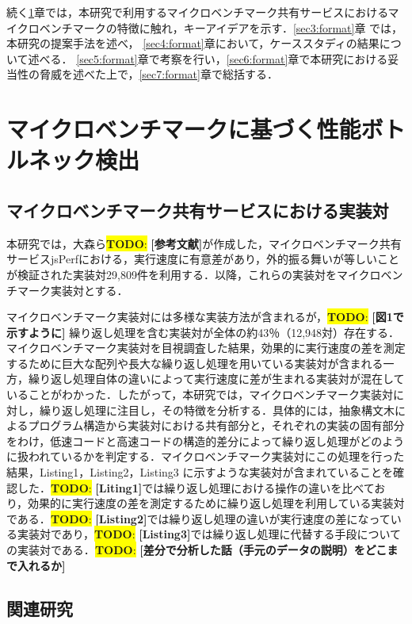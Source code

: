\documentclass[submit,techrep,noauthor]{ipsj}
\newcommand{\todo}[1]{\colorbox{yellow}{{\bf TODO}:}{\color{red} {\textbf{[#1]}}}}
\begin{document}
続く\ref{sec2:format}章では，本研究で利用するマイクロベンチマーク共有サービスにおけるマイクロベンチマークの特徴に触れ，キーアイデアを示す．\ref{sec3:format}章 では，本研究の提案手法を述べ， \ref{sec4:format}章において，ケーススタディの結果について述べる． \ref{sec5:format}章で考察を行い，\ref{sec6:format}章で本研究における妥当性の脅威を述べた上で，\ref{sec7:format}章で総括する． 


\section{マイクロベンチマークに基づく性能ボトルネック検出}
\label{sec2:format}

\subsection{マイクロベンチマーク共有サービスにおける実装対}

本研究では，大森ら\todo{参考文献}が作成した，マイクロベンチマーク共有サービスjsPerfにおける，実行速度に有意差があり，外的振る舞いが等しいことが検証された実装対29,809件を利用する．以降，これらの実装対をマイクロベンチマーク実装対とする．

マイクロベンチマーク実装対には多様な実装方法が含まれるが，\todo{図1で示すように} 繰り返し処理を含む実装対が全体の約43％（12,948対）存在する．マイクロベンチマーク実装対を目視調査した結果，効果的に実行速度の差を測定するために巨大な配列や長大な繰り返し処理を用いている実装対が含まれる一方，繰り返し処理自体の違いによって実行速度に差が生まれる実装対が混在していることがわかった．したがって，本研究では，マイクロベンチマーク実装対に対し，繰り返し処理に注目し，その特徴を分析する．具体的には，抽象構文木によるプログラム構造から実装対における共有部分と，それぞれの実装の固有部分をわけ，低速コードと高速コードの構造的差分によって繰り返し処理がどのように扱われているかを判定する．マイクロベンチマーク実装対にこの処理を行った結果，Listing1，Listing2，Listing3 に示すような実装対が含まれていることを確認した．\todo{Liting1}では繰り返し処理における操作の違いを比べており，効果的に実行速度の差を測定するために繰り返し処理を利用している実装対である．\todo{Listing2}では繰り返し処理の違いが実行速度の差になっている実装対であり，\todo{Listing3}では繰り返し処理に代替する手段についての実装対である．\todo{差分で分析した話（手元のデータの説明）をどこまで入れるか}


\subsection{関連研究}
\end{document}
